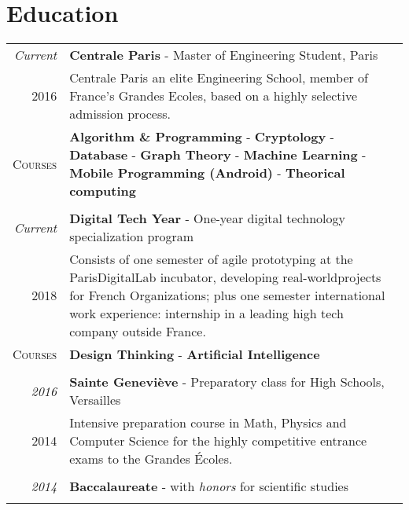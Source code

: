 \documentclass[a4paper,10pt]{article}
\newcommand{\myFonction}[1]{
  \textbf{#1}
}
\newcommand{\tech}[1]{
  \textbf{#1}
}
\begin{document}

\section{Education}
\begin{tabular}{r|p{15cm}}

  \emph{Current}              & \myFonction{Centrale Paris}- Master of Engineering Student, Paris\\
  \textsc{2016}               & \small{Centrale Paris an elite Engineering School, member of France’s Grandes Ecoles, based on a highly selective admission process.}\\
  \textsc{Courses}            & \small{\tech{Algorithm \& Programming} - \tech{Cryptology} - \tech{Database} - \tech{Graph Theory} - \tech{Machine Learning} - \tech{Mobile Programming (Android)} - \tech{Theorical computing}}\\
  \multicolumn{2}{c}{} \\

  \emph{Current}              & \myFonction{Digital Tech Year}- One-year digital technology specialization program\\
  \textsc{2018}               & \small{Consists of one semester of agile prototyping at the ParisDigitalLab incubator, developing real-worldprojects for French Organizations; plus one semester international work experience: internship in a leading high tech company outside France.}\\
  \textsc{Courses}            & \small{\tech{Design  Thinking} - \tech{Artificial  Intelligence}}\\
  \multicolumn{2}{c}{} \\

  \emph{2016}                 & \myFonction{Sainte Geneviève}- Preparatory class for High Schools, Versailles\\
   \textsc{2014}              & \small{Intensive preparation course in Math, Physics and Computer Science for the highly competitive entrance exams to the Grandes Écoles.}\\
  \multicolumn{2}{c}{} \\

  \emph{2014}                 & \myFonction{Baccalaureate} - with \emph{honors} for scientific studies\\
  \multicolumn{2}{c}{} \\

\end{tabular}
\end{document}
